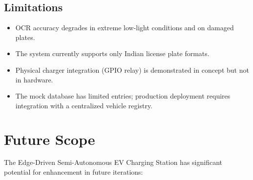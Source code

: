 \section{Limitations}
\begin{itemize}
    \item OCR accuracy degrades in extreme low-light conditions and on damaged plates.
    \item The system currently supports only Indian license plate formats.
    \item Physical charger integration (GPIO relay) is demonstrated in concept but not in hardware.
    \item The mock database has limited entries; production deployment requires integration with a centralized vehicle registry.
\end{itemize}

\chapter{Future Scope}

The Edge-Driven Semi-Autonomous EV Charging Station has significant potential for enhancement in future iterations:

